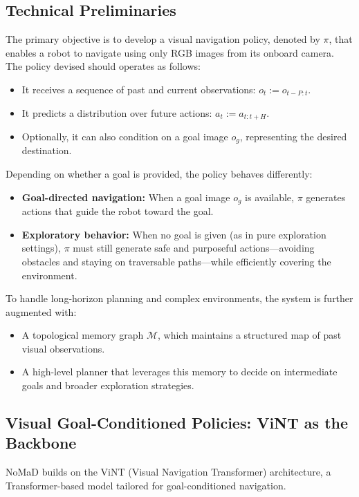 \documentclass[12pt]{article}
\begin{document}
\begin{appendices}
\section{Technical Preliminaries}
The primary objective is to develop a visual navigation policy, denoted by $\pi$, that enables a robot to navigate using only RGB images from its onboard camera. \\
The policy devised should operates as follows:
\begin{itemize} 
    \item It receives a sequence of past and current observations: $o_t := o_{t-P : t}$. 
    \item It predicts a distribution over future actions: $a_t := a_{t : t+H}$. 
    \item Optionally, it can also condition on a goal image $o_g$, representing the desired destination. 
\end{itemize}
Depending on whether a goal is provided, the policy behaves differently: 
\begin{itemize} 
    \item \textbf{Goal-directed navigation:} When a goal image $o_g$ is available, $\pi$ generates actions that guide the robot toward the goal. 
    \item \textbf{Exploratory behavior:} When no goal is given (as in pure exploration settings), $\pi$ must still generate safe and purposeful actions—avoiding obstacles and staying on traversable paths—while efficiently covering the environment. 
\end{itemize}
To handle long-horizon planning and complex environments, the system is further augmented with: 
\begin{itemize} 
    \item A topological memory graph $\mathcal{M}$, which maintains a structured map of past visual observations. 
    \item A high-level planner that leverages this memory to decide on intermediate goals and broader exploration strategies. 
\end{itemize}
\subsection*{Visual Goal-Conditioned Policies: ViNT as the Backbone}
NoMaD builds on the ViNT (Visual Navigation Transformer) architecture, a Transformer-based model tailored for goal-conditioned navigation.\\

\end{appendices}
\end{document}
